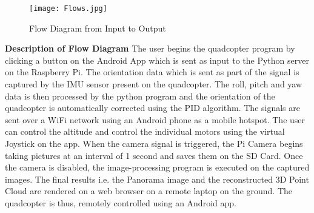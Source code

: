 \begin{figure}[H]
  \centering
  \texttt{[image: Flows.jpg]}
  \caption{Flow Diagram from Input to Output}
  \label{Flow}	
\end{figure}

\textbf{Description of Flow Diagram}
\newline
The user begins the quadcopter program by clicking a button on the Android App which is sent as input to the Python server on the Raspberry Pi. The orientation data which is sent as part of the signal is captured by the IMU sensor present on the quadcopter. The roll, pitch and yaw data is then processed by the python program and the orientation of the quadcopter is automatically corrected using the PID algorithm. The signals are sent over a WiFi network using an Android phone as a mobile hotspot. The user can control the altitude and control the individual motors using the virtual Joystick on the app. When the camera signal is triggered, the Pi Camera begins taking pictures at an interval of 1 second and saves them on the SD Card. Once the camera is disabled, the image-processing program is executed on the captured images. The final results i.e. the Panorama image and the reconstructed 3D Point Cloud are rendered on a web browser on a remote laptop on the ground. The quadcopter is thus, remotely controlled using an Android app.



